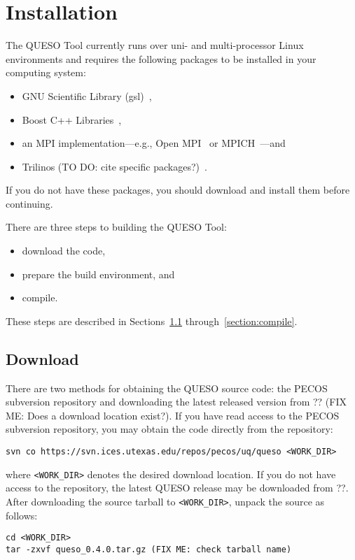 \chapter{Installation}\label{ch-install}
\thispagestyle{headings}

The QUESO Tool currently runs over uni- and multi-processor Linux
environments and requires the following packages to be installed in
your computing system:
%
\begin{itemize}
\item GNU Scientific Library (gsl)~\cite{gsl},
\item Boost C++ Libraries~\cite{boost}, 
\item an MPI implementation---e.g., Open MPI~\cite{Openmpi} or MPICH~\cite{Mpich}---and
\item Trilinos (TO DO: cite specific packages?)~\cite{Trilinos}.
\end{itemize}
%
If you do not have these packages, you should download and install
them before continuing.

There are three steps to building the QUESO Tool:
%
\begin{itemize}
\item download the code,
\item prepare the build environment, and
\item compile.
\end{itemize}
%
These steps are described in Sections~\ref{section:download}
through~\ref{section:compile}.

\section{Download} \label{section:download}
There are two methods for obtaining the QUESO source code: the PECOS
subversion repository and downloading the latest released version from
?? (FIX ME: Does a download location exist?).  If you have read access
to the PECOS subversion repository, you may obtain the code directly
from the repository:
%
\begin{verbatim}
svn co https://svn.ices.utexas.edu/repos/pecos/uq/queso <WORK_DIR>
\end{verbatim}
%
where \verb+<WORK_DIR>+ denotes the desired download location.  If you
do not have access to the repository, the latest QUESO release may be
downloaded from ??.  After
downloading the source tarball to \verb+<WORK_DIR>+, unpack the source
as follows:
%
\begin{verbatim}
cd <WORK_DIR>
tar -zxvf queso_0.4.0.tar.gz (FIX ME: check tarball name)
\end{verbatim}
%

